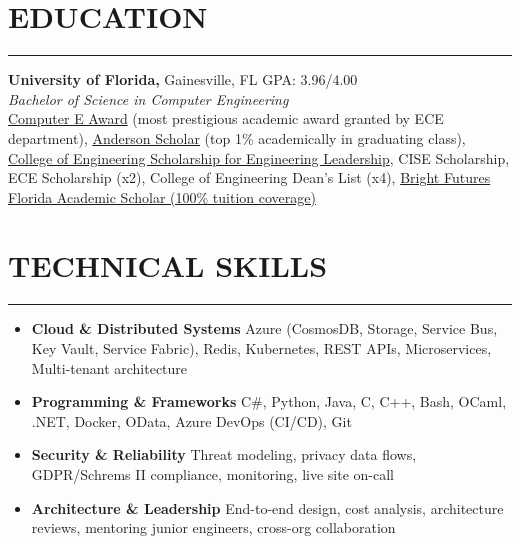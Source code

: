 \documentclass[11pt]{article}
\begin{document}
\section*{EDUCATION}
\hrule
\vspace{0.3cm}
\noindent
\textbf{University of Florida,} Gainesville, FL \hfill{GPA: 3.96/4.00}\\
\textit{Bachelor of Science in Computer Engineering}\\
    \href{https://www.ece.ufl.edu/people/student-awards/}
            {Computer E Award} (most prestigious academic award granted by ECE department),
    \href{https://clas.ufl.edu/undergraduate/anderson-scholars/}
            {Anderson Scholar} (top 1\% academically in graduating class),
    \href{https://www.eng.ufl.edu/leadership/students/scholarships/thomas-o-hunter-leadership/}
            {College of Engineering Scholarship for Engineering Leadership},
    CISE Scholarship,
    ECE Scholarship (x2),
    College of Engineering Dean\rq s List (x4),
    \href{https://en.wikipedia.org/wiki/Bright_Futures_Scholarship_Program}{Bright Futures Florida Academic Scholar (100\% tuition coverage)}

\vspace{0.6cm}
\section*{TECHNICAL SKILLS}
\hrule
\vspace{0.3cm}

\begin{itemize}[noitemsep,nolistsep,label={}]
    \item \textbf{Cloud \& Distributed Systems}
          Azure (CosmosDB, Storage, Service Bus, Key Vault, Service Fabric), 
          Redis, Kubernetes, REST APIs, Microservices, Multi-tenant architecture

    \item \textbf{Programming \& Frameworks}
          C\#, Python, Java, C, C++, Bash, OCaml, .NET, 
          Docker, OData, Azure DevOps (CI/CD), Git

    \item \textbf{Security \& Reliability}
          Threat modeling, privacy data flows, GDPR/Schrems II compliance, monitoring,
          live site on-call

    \item \textbf{Architecture \& Leadership}
          End-to-end design, cost analysis, architecture reviews,
          mentoring junior engineers, cross-org collaboration

\end{itemize}
\end{document}
